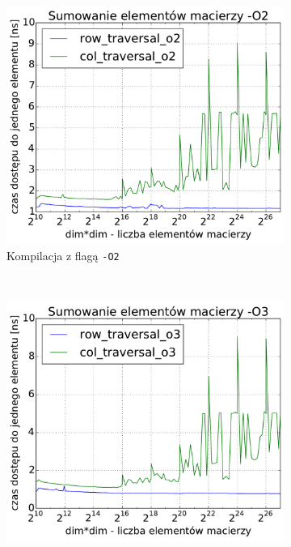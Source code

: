 \begin{figure}[!h]
\begin{subfigure}[c]{0.45\textwidth}
	\end{subfigure}
	\\
    \vspace{0.4cm}
	\begin{subfigure}[c]{0.45\textwidth}
		\centering
		\includegraphics[width=\textwidth]{images/benchs/matrix_sum_O2}
		\caption{Kompilacja z flagą \texttt{-O2}}
	\end{subfigure}
	~
	\begin{subfigure}[c]{0.45\textwidth}
		\centering
		\includegraphics[width=\textwidth]{images/benchs/matrix_sum_O3}

\end{subfigure}
\end{figure}
